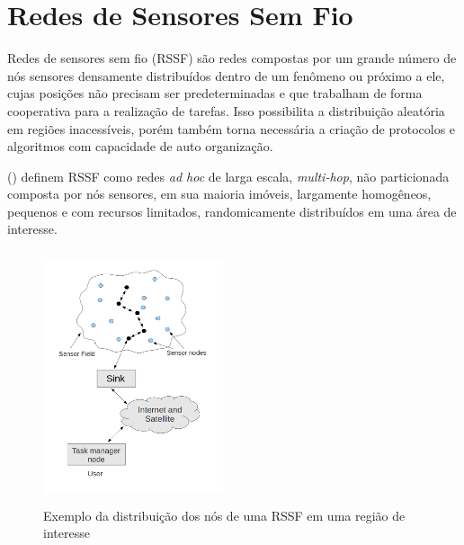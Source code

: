 \section{Redes de Sensores Sem Fio}

Redes de sensores sem fio (RSSF) são redes compostas por um grande número de nós sensores densamente distribuídos dentro de um fenômeno ou próximo a ele, cujas posições não precisam ser predeterminadas e que trabalham de forma cooperativa para a realização de tarefas. Isso possibilita a distribuição aleatória em regiões inacessíveis, porém também torna necessária a criação de protocolos e algoritmos com capacidade de auto organização\cite{Akyildiz2002}.

 (\citeyear{Romer2004}) definem RSSF como redes \textit{ad hoc} de larga escala, \textit{multi-hop}, não particionada composta por nós sensores, em sua maioria imóveis, largamente homogêneos, pequenos e com recursos limitados, randomicamente distribuídos em uma área de interesse.


\begin{figure}[!htb]
\centering
\includegraphics[width=200px,height=280px]{./Pictures/SensorNodesScatteredInASensorField.png}
\caption{Exemplo da distribuição dos nós de uma RSSF em uma região de interesse} %
\label{fig:snsf} %
\end{figure}

